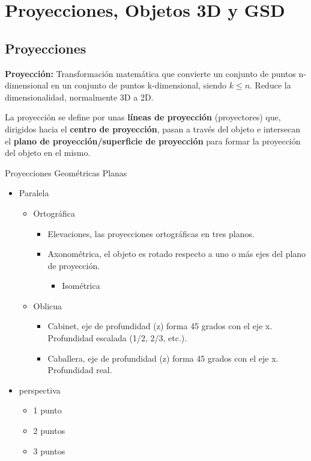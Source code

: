 \chapter{Proyecciones, Objetos 3D y GSD}
\section{Proyecciones}
\textbf{Proyección:} Transformación matemática que convierte un conjunto de puntos n-dimensional en un conjunto de puntos k-dimensional, siendo $k \leq n$. Reduce la dimensionalidad, normalmente 3D a 2D.

La proyección se define por unas \textbf{líneas de proyección} (proyectores) que, dirigidos hacia el \textbf{centro de proyección}, pasan a través del objeto e intersecan el \textbf{plano de proyección/superficie de proyección} para formar la proyección del objeto en el mismo.

Proyecciones Geométricas Planas
\begin{itemize}
    \item Paralela
    \begin{itemize}
        \item Ortográfica
        \begin{itemize}
            \item Elevaciones, las proyecciones ortográficas en tres planos.
            \item Axonométrica, el objeto es rotado respecto a uno o más ejes del plano de proyección.
            \begin{itemize}
                \item Isométrica
            \end{itemize}
        \end{itemize}
        \item Oblicua
        \begin{itemize}
            \item Cabinet, eje de profundidad (z) forma 45 grados con el eje x. Profundidad escalada (1/2, 2/3, etc.).
            \item Caballera, eje de profundidad (z) forma 45 grados con el eje x. Profundidad real.
        \end{itemize}
    \end{itemize}
    \item perspectiva
    \begin{itemize}
        \item 1 punto
        \item 2 puntos
        \item 3 puntos
    \end{itemize}
\end{itemize}

